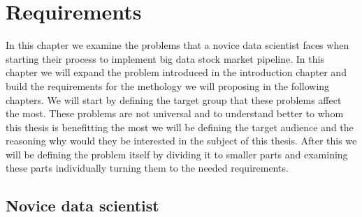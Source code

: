 \chapter{Requirements}
\label{chapter:problem}

In this chapter we examine the problems that a novice data scientist faces when starting their process to implement big data stock market pipeline.
In this chapter we will expand the problem introduced in the introduction chapter and build the requirements for the methology we will proposing in the following chapters.
We will start by defining the target group that these problems affect the most.
These problems are not universal and to understand better to whom this thesis is benefitting the most we will be defining the target audience and the reasoning why would they be interested in the subject of this thesis.
After this we will be defining the problem itself by dividing it to smaller parts and examining these parts individually turning them to the needed requirements.

\section{Novice data scientist}

